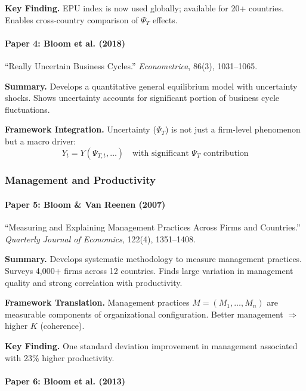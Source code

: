 \textbf{Key Finding.}
EPU index is now used globally; available for 20+ countries. Enables cross-country
comparison of $\Psi_T$ effects.

\paragraph{Paper 4: Bloom et al. (2018)}

``Really Uncertain Business Cycles.''
\textit{Econometrica}, 86(3), 1031--1065.

\textbf{Summary.}
Develops a quantitative general equilibrium model with uncertainty shocks.
Shows uncertainty accounts for significant portion of business cycle fluctuations.

\textbf{Framework Integration.}
Uncertainty ($\Psi_T$) is not just a firm-level phenomenon but a macro driver:
\begin{equation}
  Y_t = Y(\Psi_{T,t}, \ldots) \quad \text{with significant } \Psi_T \text{ contribution}
\end{equation}

\subsubsection{Management and Productivity}

\paragraph{Paper 5: Bloom \& Van Reenen (2007)}

``Measuring and Explaining Management Practices Across Firms and Countries.''
\textit{Quarterly Journal of Economics}, 122(4), 1351--1408.

\textbf{Summary.}
Develops systematic methodology to measure management practices. Surveys 4,000+
firms across 12 countries. Finds large variation in management quality and strong
correlation with productivity.

\textbf{Framework Translation.}
Management practices $M = (M_1, \ldots, M_n)$ are measurable components of organizational
configuration. Better management $\Rightarrow$ higher $K$ (coherence).

\textbf{Key Finding.}
One standard deviation improvement in management associated with 23\% higher productivity.

\paragraph{Paper 6: Bloom et al. (2013)}


